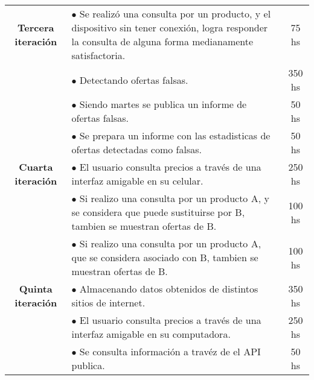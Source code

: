 \begin{center}
\begin{tabular}{| c | p{10cm} | c |}
		\hline
		\textbf{Tercera iteración}& $\bullet$ Se realizó una consulta por un producto, y el dispositivo sin tener conexión, logra responder la consulta de alguna forma medianamente satisfactoria. & 75 hs \\
								  & $\bullet$ Detectando ofertas falsas. & 350 hs\\
								  & $\bullet$ Siendo martes se publica un informe de ofertas falsas. & 50 hs \\
								  & $\bullet$ Se prepara un informe con las estadisticas de ofertas detectadas como falsas. & 50 hs\\

		\hline
		\textbf{Cuarta iteración}& $\bullet$ El usuario consulta precios a través de una interfaz amigable en su celular. & 250 hs \\
								 & $\bullet$ Si realizo una consulta por un producto A, y se considera que puede sustituirse por B, tambien se muestran ofertas de B. & 100 hs \\
								 & $\bullet$ Si realizo una consulta por un producto A, que se considera asociado con B, tambien se muestran ofertas de B. & 100 hs \\

		\hline
		\textbf{Quinta iteración}& $\bullet$ Almacenando datos obtenidos de distintos sitios de internet. & 350 hs \\
								 & $\bullet$ El usuario consulta precios a través de una interfaz amigable en su computadora. & 250 hs \\
								 & $\bullet$ Se consulta información a travéz de el API publica. & 50 hs \\

		\hline
	\end{tabular}
\end{center}

